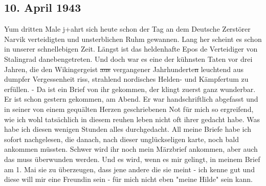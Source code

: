 \subsection{10. April 1943}

Yum dritten Male j+ahrt sich heute schon der Tag an dem Deutsche Zerst\"{o}rer Narvik verteidigten und unsterblichen Ruhm gewannen.
Lang her scheint es schon in unserer schnellebigen Zeit.
L\"{a}ngst ist das heldenhafte Epos de Verteidiger von Stalingrad danebengetreten.
Und doch war es eine der k\"{u}hnsten Taten vor drei Jahren, die den Wikingergeist \st{aus} vergangener Jahrhunderte\st{n} leuchtend aus dumpfer Vergessenheit riss, strahlend nordisches Helden- und K\"{a}mpfertum zu erf\"{u}llen.
- Da ist ein Brief von ihr gekommen, der klingt zuerst ganz wunderbar.
Er ist schon gestern gekommen, am Abend.
Er war handschriftlich abgefasst und in seiner von einem gequ\"{a}lten Herzen geschriebenen Not f\"{u}r mich so ergreifend, wie ich wohl tats\"{a}chlich in diesem reuhen leben nicht oft ihrer gedacht habe.
Was habe ich diesen wenigen Stunden alles durchgedacht.
All meine Briefe habe ich sofort nachgelesen, die danach, nach dieser ungl\"{u}ckseligen karte, noch bald ankommen m\"{u}ssten.
Schwer wird ihr noch mein M\"{a}rzbrief ankommen, aber auch das muss \"{u}berwunden werden.
Und es wird, wenn es mir gelingt, in meinem Brief am 1. Mai sie zu \"{u}berzeugen, dass jene andere die sie meint - ich kenne gut und diese will mir eine Freundin sein - f\"{u}r mich nicht eben "meine Hilde" sein kann.


\clearpage
